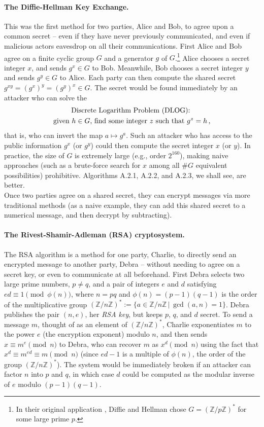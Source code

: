 \documentclass{llncs}
\numberwithin{equation}{section}
\newcommand{\Z}{{\mathbb{Z}}}
\renewcommand\({\left(}
\renewcommand\){\right)}
\begin{document}
\paragraph{\bf The Diffie-Hellman Key Exchange.}  This was the first method for two parties, Alice and Bob, to agree upon a common  secret
 --
 even if they have never previously communicated,  and even if malicious actors eavesdrop on all their communications.  First Alice and Bob   agree on a finite cyclic group $G$ and a generator $g$ of $G$.\footnote{In their original application \cite{DH}, Diffie and Hellman chose $G=(\Z/p\Z)^*$ for some large prime $p$.}  Alice chooses a secret integer $x$, and sends $g^x\in G$ to Bob.  Meanwhile, Bob chooses a secret integer $y$ and sends $g^y\in G$ to Alice.  Each party can then compute the shared secret $g^{xy}=(g^x)^y=(g^y)^x\in G$.   The secret would be  found immediately by an attacker who can solve the
\begin{multline}\label{DLOG}
  \text{Discrete Logarithm Problem (DLOG): }
  \\
   \text{given $h\in G$, find some integer $z$ such that $g^z=h$\,,}
\end{multline}
that is, who can invert the map $a\mapsto g^a$.  Such an attacker who has access to the public information $g^x$ (or $g^y$) could then compute the secret integer  $x$ (or $y$).  In practice, the size of $G$ is extremely large (e.g., order $2^{160}$), making naive approaches (such as a brute-force search for $x$ among all $\#G$ equivalent possibilities) prohibitive.  Algorithms A.2.1, A.2.2, and A.2.3, we shall see, are better.
\\

Once two parties agree on a shared secret, they can encrypt messages via more traditional methods (as a naive example, they can add this shared secret  to a numerical message, and then decrypt by subtracting).



\paragraph{\bf The Rivest-Shamir-Adleman (RSA) cryptosystem.} The RSA algorithm is a  method for one party, Charlie, to directly send an encrypted message to another party, Debra -- without   needing to agree on a secret key, or even  to communicate at all beforehand.  First Debra selects two  large prime numbers, $p\neq q$, and a pair of integers $e$ and $d$  satisfying $ed\equiv1\pmod {\phi(n)}$, where  $n=pq$ and $\phi(n)=(p-1)(q-1)$ is the order of the multiplicative group $(\Z/n\Z)^*:=\{a\in \Z/n\Z\,|\, \gcd(a,n)=1\}$.  Debra publishes the pair $(n,e)$, her {\it RSA key},
but keeps $p$, $q$, and $d$ secret.  To send a message $m$, thought of as an element of $(\Z/n\Z)^*$, Charlie exponentiates $m$ to the power $e$ (the encryption exponent) modulo $n$, and then sends $x\equiv m^e\pmod n$ to Debra, who can recover $m$ as $x^d\pmod n$ using the fact that $x^d\equiv m^{ed}\equiv m \pmod n$ (since $ed-1$ is a multiple of  $\phi(n)$, the order of the group $(\Z/n\Z)^*$).  The system would  be immediately broken if an attacker can factor $n$ into $p$ and $q$, in which case $d$ could be computed as the modular inverse of $e$ modulo $(p-1)(q-1)$.
\end{document}
